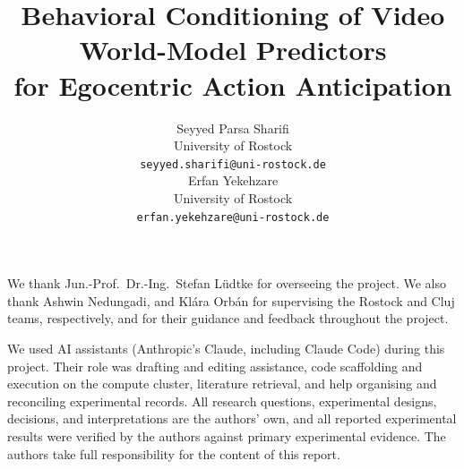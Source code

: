 \documentclass{article}
\title{Behavioral Conditioning of Video World-Model Predictors\\
for Egocentric Action Anticipation}
\author{%
  Seyyed Parsa Sharifi \\
  University of Rostock \\
  \texttt{seyyed.sharifi@uni-rostock.de} \\
  \And
  Erfan Yekehzare \\
  University of Rostock \\
  \texttt{erfan.yekehzare@uni-rostock.de} \\
}
\begin{document}
\maketitle

\begin{center}
\end{center}











\begin{ack}
We thank Jun.-Prof.\ Dr.-Ing.\ Stefan L\"udtke for overseeing the project.
We also thank Ashwin Nedungadi, and Kl\'ara Orb\'an for supervising the Rostock
and Cluj teams, respectively, and for their guidance and feedback throughout the
project.

We used AI assistants (Anthropic's Claude, including Claude Code) during this
project. Their role was drafting and editing assistance, code scaffolding and
execution on the compute cluster, literature retrieval, and help organising and
reconciling experimental records. All research questions, experimental designs,
decisions, and interpretations are the authors' own, and all reported
experimental results were verified by the authors against primary experimental
evidence. The authors take full responsibility for the content of this report.
\end{ack}




\appendix






\end{document}
